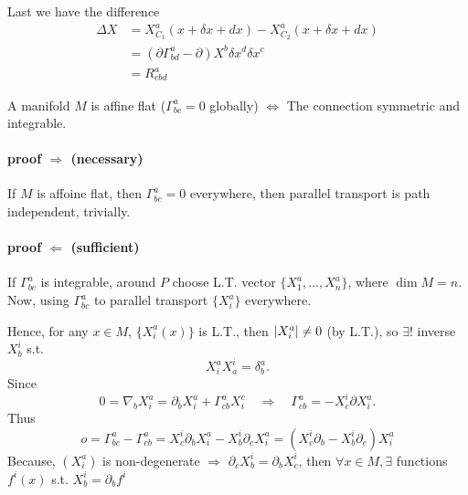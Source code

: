Last we have the difference 
\begin{equation}
\begin{aligned}
\Delta X &= X^{a}_{C_1}(x+\delta x+dx) - X^{a}_{C_2}(x+\delta x+dx)\\
&= \left(\partial \Gamma^{a}_{bd} - \partial\right) X^{b}\delta x^{d}\delta x^{c}\\
&= R^{a}_{cbd}
\end{aligned}
\end{equation}



A manifold $M$ is affine flat ($\Gamma^{a}_{bc}=0$ globally) $\Longleftrightarrow$ The connection symmetric and integrable.

\paragraph{proof $\Rightarrow$ (necessary)} %

If $M$ is affoine flat, then $\Gamma^{a}_{bc}=0$ everywhere, then parallel transport is path independent, trivially.

\paragraph{proof $\Leftarrow$ (sufficient)} %

If $\Gamma^{a}_{bc}$ is integrable, around $P$ choose L.T. vector  $\{X^{a}_{1},\ldots,X^{a}_{n}\}$, where $\operatorname{dim} M = n$. Now, using $\Gamma^{a}_{bc}$ to parallel transport $\{X^{a}_{i}\}$ everywhere. 

Hence, for any $x\in M$, $\{X^{a}_{i}(x)\}$ is L.T., then $\abs{X^{a}_{i}}\neq 0$ (by L.T.), so $\exists !$ inverse $X^{i}_{b}$ s.t. 
\begin{equation}
X^{a}_{i}X^{i}_{a} = \delta^{a}_{b}.
\end{equation}
Since
\begin{equation}
0 = \nabla_{b} X^{a}_{i} = \partial_{b} X^{a}_{i} + \Gamma^{a}_{cb} X^{c}_{i}
\quad\Rightarrow\quad
\Gamma^{a}_{cb} = - X^{i}_{c} \partial X^{a}_{i}.
\end{equation}
Thus 
\begin{equation}
o = \Gamma^{a}_{bc} - \Gamma^{a}_{cb} = X^{i}_{c}\partial_{b} X^{a}_{i} - X^{i}_{b} \partial_{c}X^{a}_{i} = \left(X^{i}_{c}\partial_{b} - X^{i}_{b} \partial_{c}\right)X^{a}_{i}
\end{equation}
Because, $(X^{a}_{i})$ is non-degenerate $\Rightarrow$ $\partial_c X^{i}_{b} = \partial_{b} X^{i}_{c}$, then $\forall x\in M, \exists$ functions $f^{i}(x)$ s.t. $X^{i}_{b} = \partial_{b} f^{i}$

